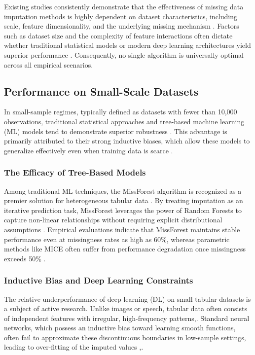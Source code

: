 \documentclass[twocolumn, 9pt]{extarticle}
\begin{document}
Existing studies consistently demonstrate that the effectiveness of missing data imputation methods is highly dependent on dataset characteristics, including scale, feature dimensionality, and the underlying missing mechanism \cite{sun2023deep}. Factors such as dataset size and the complexity of feature interactions often dictate whether traditional statistical models or modern deep learning architectures yield superior performance \cite{sun2023deep, Grinsztajn2022}. Consequently, no single algorithm is universally optimal across all empirical scenarios.\cite{sun2023deep}

\subsection{Performance on Small-Scale Datasets}
In small-sample regimes, typically defined as datasets with fewer than 10,000 observations, traditional statistical approaches and tree-based machine learning (ML) models tend to demonstrate superior robustness \cite{Grinsztajn2022}. This advantage is primarily attributed to their strong inductive biases, which allow these models to generalize effectively even when training data is scarce \cite{beyazit2023}.

\subsubsection{The Efficacy of Tree-Based Models}
Among traditional ML techniques, the MissForest algorithm is recognized as a premier solution for heterogeneous tabular data \cite{Stekhoven2012}. By treating imputation as an iterative prediction task, MissForest leverages the power of Random Forests to capture non-linear relationships without requiring explicit distributional assumptions \cite{Stekhoven2012}. Empirical evaluations indicate that MissForest maintains stable performance even at missingness rates as high as 60\%, whereas parametric methods like MICE often suffer from performance degradation once missingness exceeds 50\% \cite{Azur2011}.

\subsubsection{Inductive Bias and Deep Learning Constraints}
The relative underperformance of deep learning (DL) on small tabular datasets is a subject of active research. Unlike images or speech, tabular data often consists of independent features with irregular, high-frequency patterns\cite{Grinsztajn2022},\cite{beyazit2023}. Standard neural networks, which possess an inductive bias toward learning smooth functions, often fail to approximate these discontinuous boundaries in low-sample settings, leading to over-fitting of the imputed values \cite{Grinsztajn2022},\cite{beyazit2023}.
\end{document}
